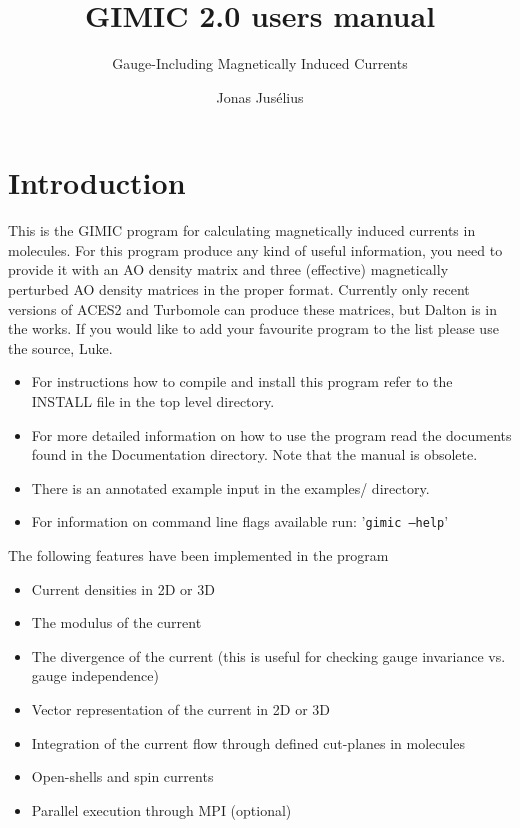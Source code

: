 \documentclass[a4paper,11pt]{article}
\begin{document}
\title{GIMIC 2.0 users manual}
\subtitle{Gauge-Including Magnetically Induced Currents}

\author{{\sf Jonas Jus\'elius}}
\address{
{\sf University of Tromsø}\\
{\sf Department of Chemistry}\\
{\sf N-9037 Tromsø}
}
\maketitle

\section{Introduction}
This is the GIMIC  program for calculating magnetically induced currents in
molecules. For this program produce any kind of useful information, you 
need to provide it with an AO density matrix and three (effective)
magnetically perturbed AO density matrices in the proper format. Currently
only recent versions of ACES2 and Turbomole can produce these matrices, but
Dalton is in the works. If you would like to add your favourite program to the
list please use the source, Luke.

\begin{itemize}
  \item For instructions how to compile and install this program refer to
  the INSTALL file in the top level directory. 
\item For more detailed information on how to use the program read the documents 
  found in the Documentation directory. Note that the manual is obsolete.
\item There is an annotated example input in the examples/ directory. 
\item For information on command line flags available run: 
  '\texttt{gimic --help}'
\end{itemize}

The following features have been implemented in the
program
\begin{itemize}
  \item Current densities in 2D or 3D
  \item The modulus of the current 	
  \item The divergence of the current (this is useful for checking gauge
	invariance vs. gauge independence)
  \item Vector representation of the current in 2D or 3D
  \item Integration of the current flow through defined cut-planes in
	molecules
  \item Open-shells and spin currents
  \item Parallel execution through MPI (optional)
\end{itemize}
\end{document}
